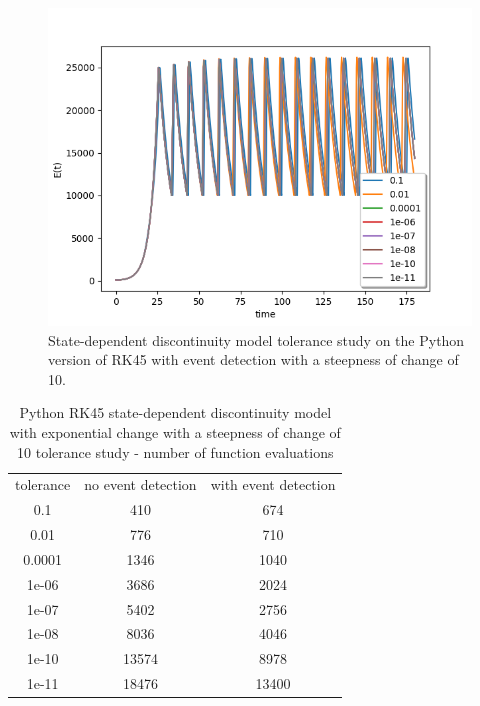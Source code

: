 \begin{figure}[H]
\centering
\includegraphics[width=0.7\linewidth]{./figures/exp_state_tol_rk45_event_10}
\caption{State-dependent discontinuity model tolerance study on the Python version of RK45 with event detection with a steepness of change of 10.}
\label{fig:exp_state_tol_rk45_event_10}
\end{figure}

\begin{table}[H]
\caption {Python RK45 state-dependent discontinuity model with exponential change with a steepness of change of 10 tolerance study - number of function evaluations} \label{tab:exp_state_tol_rk45_10} 
\begin{center}
\begin{tabular}{ c c c }
tolerance & no event detection & with event detection \\ 
0.1 & 410 & 674 \\
0.01 & 776 & 710 \\
0.0001 & 1346 & 1040 \\
1e-06 & 3686 & 2024 \\
1e-07 & 5402 & 2756 \\
1e-08 & 8036 & 4046 \\
1e-10 & 13574 & 8978 \\
1e-11 & 18476 & 13400 \\
\end{tabular}
\end{center}
\end{table}



